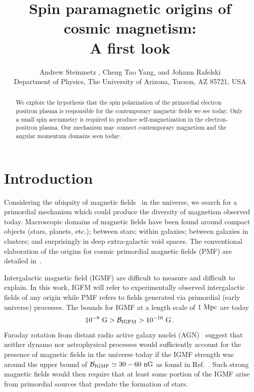 \documentclass[a4paper]{article}
\title{\boldmath Spin paramagnetic origins of cosmic magnetism:\\ A first look}
\author{Andrew Steinmetz\orc{\orcC}%
, Cheng Tao Yang\orc{\orcB}, and Johann Rafelski\orc{\orcA}\\ Department of Physics, The University of Arizona, Tucson, AZ 85721, USA}
\newcommand*{\xblue}{\color{black}}
\begin{document}
\maketitle

\begin{abstract}
    We explore the hypothesis that the spin polarization of the primordial electron positron plasma is responsible for the contemporary magnetic fields we see today. Only a small spin asymmetry is required to produce self-magnetization in the electron-positron plasma. Our mechanism may connect contemporary magnetism and the angular momentum domains seen today.
\end{abstract}


\section{Introduction}
\label{sec:introduction}
\noindent  
Considering the ubiquity of magnetic fields~\cite{giovannini2003magnetized,kronberg1994extragalactic} in the universe, we search for a primordial mechanism which could produce {\xblue the diversity of magnetism observed today.} Macroscopic domains of magnetic fields have been found around compact objects (stars, planets, etc.); between stars; within galaxies; between galaxies in clusters; and surprisingly in deep extra-galactic void spaces. The conventional elaboration of the origins for cosmic  primordial magnetic fields (PMF) are detailed in~\cite{gaensler2004origin,durrer2013cosmological,batista2021gammaray}.

Intergalactic magnetic field (IGMF) are  difficult to measure and difficult to explain. {\xblue In this work, IGFM will refer to experimentally observed intergalactic fields of any origin while PMF refers to fields generated via primordial (early universe) processes.} The bounds for IGMF at a length scale of $1{\rm\ Mpc}$ are today~\cite{neronov2010evidence,taylor2011extragalactic,pshirkov2015new,jedamzik2019stringent,vernstrom2021discovery}
\begin{align}
    \label{igmf}
    10^{-8}{\rm\ G}>\mathcal{B}_{\rm IGFM}>10^{-16}{\rm\ G}\,.
\end{align}
Faraday rotation from distant radio active galaxy nuclei (AGN)~\cite{pomakov2022redshift} suggest that neither dynamo nor astrophysical processes would sufficiently account for the presence of magnetic fields in the universe today if the IGMF strength was around the upper bound of ${\cal B}_{\rm IGMF}\simeq30-60{\rm\ nG}$ as found in Ref.~\cite{vernstrom2021discovery}. Such strong magnetic fields would then require that at least some portion of the IGMF arise from primordial sources that predate the formation of stars.
\end{document}
